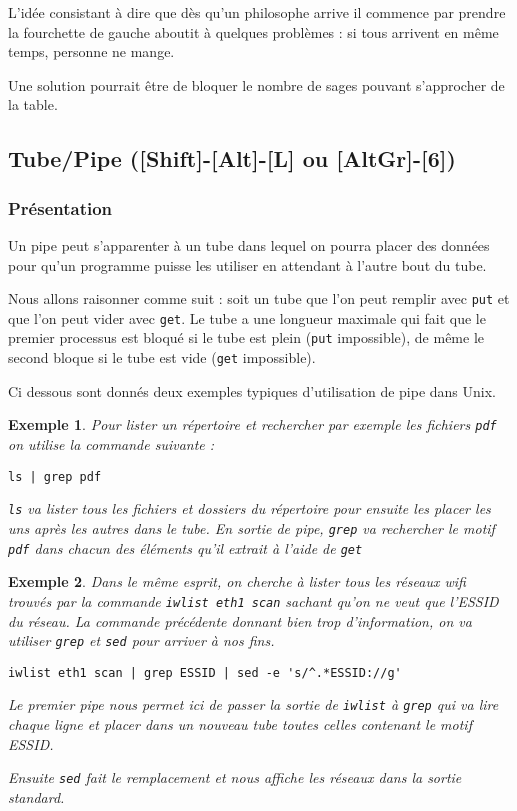 \documentclass[12pt,a4paper]{report}
\newtheorem*{ex}{Exemple}
\begin{document}
\medskip

L'idée consistant à dire que dès qu'un philosophe arrive il commence par prendre la fourchette de gauche aboutit à quelques problèmes : si tous arrivent en même temps, personne ne mange.

Une solution pourrait être de bloquer le nombre de sages pouvant s'approcher de la table.


\subsection{Tube/Pipe ([Shift]-[Alt]-[L] ou [AltGr]-[6])}
\label{sec:tube}

\subsubsection{Présentation}

Un pipe peut s'apparenter à un tube dans lequel on pourra placer des données pour qu'un programme puisse les utiliser en attendant à l'autre bout du tube.

Nous allons raisonner comme suit : soit un tube que l'on peut remplir avec \verb?put? et que l'on peut vider avec \verb?get?. Le tube a une longueur maximale qui fait que le premier processus est bloqué si le tube est plein (\verb?put? impossible), de même le second bloque si le tube est vide (\verb?get? impossible).

Ci dessous sont donnés deux exemples typiques d'utilisation de pipe dans Unix.

\begin{ex}
Pour lister un répertoire et rechercher par exemple les fichiers \texttt{pdf} on utilise la commande suivante :
\begin{verbatim}
ls | grep pdf
\end{verbatim}
\verb?ls? va lister tous les fichiers et dossiers du répertoire pour ensuite les placer les uns après les autres dans le tube. En sortie de pipe, \verb?grep? va rechercher le motif \texttt{pdf} dans chacun des éléments qu'il extrait à l'aide de \verb?get?
\end{ex}

\begin{ex}
Dans le même esprit, on cherche à lister tous les réseaux wifi trouvés par la commande \verb?iwlist eth1 scan? sachant qu'on ne veut que l'ESSID du réseau. La commande précédente donnant bien trop d'information, on va utiliser \verb?grep? et \verb?sed? pour arriver à nos fins.
\begin{verbatim}
iwlist eth1 scan | grep ESSID | sed -e 's/^.*ESSID://g'
\end{verbatim}
Le premier pipe nous permet ici de passer la sortie de \verb?iwlist? à \verb?grep? qui va lire chaque ligne et placer dans un nouveau tube toutes celles contenant le motif ESSID.

Ensuite \verb?sed? fait le remplacement et nous affiche les réseaux dans la sortie standard.
\end{ex}
\end{document}
